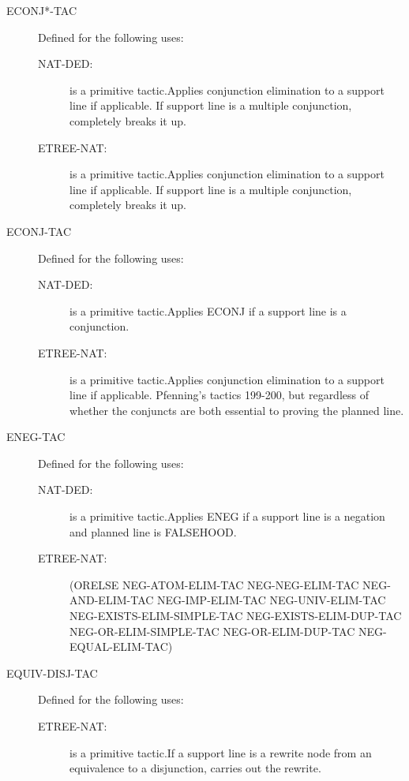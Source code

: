 \begin{description}
\begin{description}
\end{description}

\item[ECONJ*-TAC]  Defined for the following uses:
\begin{description}
\item[NAT-DED:]  is a primitive tactic.Applies conjunction elimination to a support line if applicable.
If support line is a multiple conjunction, completely breaks it up.

\item[ETREE-NAT:]  is a primitive tactic.Applies conjunction elimination to a support line if applicable.
If support line is a multiple conjunction, completely breaks it up.

\end{description}

\item[ECONJ-TAC]  Defined for the following uses:
\begin{description}
\item[NAT-DED:]  is a primitive tactic.Applies ECONJ if a support line is a conjunction.

\item[ETREE-NAT:]  is a primitive tactic.Applies conjunction elimination to a support line if applicable.
Pfenning's tactics 199-200, but regardless of whether the conjuncts
are both essential to proving the planned line.

\end{description}

\item[ENEG-TAC]  Defined for the following uses:
\begin{description}
\item[NAT-DED:]  is a primitive tactic.Applies ENEG if a support line is a negation and planned line is
FALSEHOOD.

\item[ETREE-NAT:] 
(ORELSE NEG-ATOM-ELIM-TAC NEG-NEG-ELIM-TAC NEG-AND-ELIM-TAC
 NEG-IMP-ELIM-TAC NEG-UNIV-ELIM-TAC NEG-EXISTS-ELIM-SIMPLE-TAC
 NEG-EXISTS-ELIM-DUP-TAC NEG-OR-ELIM-SIMPLE-TAC NEG-OR-ELIM-DUP-TAC
 NEG-EQUAL-ELIM-TAC)


\end{description}

\item[EQUIV-DISJ-TAC]  Defined for the following uses:
\begin{description}
\item[ETREE-NAT:]  is a primitive tactic.If a support line is a rewrite node from an equivalence to a disjunction,
carries out the rewrite.


\end{description}
\end{description}
